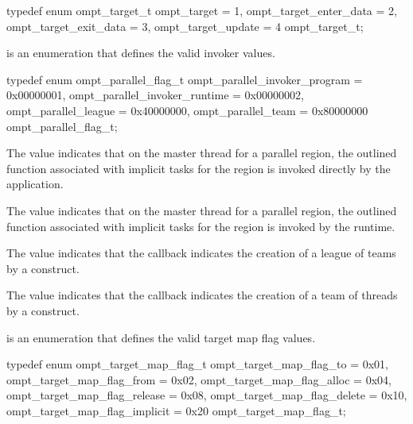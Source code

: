 \begin{ccppspecific}
\begin{omptEnum}
typedef enum ompt_target_t {
  ompt_target                         = 1,
  ompt_target_enter_data              = 2,
  ompt_target_exit_data               = 3,
  ompt_target_update                  = 4
} ompt_target_t;
\end{omptEnum}
\end{ccppspecific}





\label{sec:ompt_parallel_flag_t}
 is an enumeration that defines the valid invoker values.


\begin{ccppspecific}
\begin{omptEnum}
typedef enum ompt_parallel_flag_t {
  ompt_parallel_invoker_program = 0x00000001,
  ompt_parallel_invoker_runtime = 0x00000002,
  ompt_parallel_league          = 0x40000000,
  ompt_parallel_team            = 0x80000000
} ompt_parallel_flag_t;
\end{omptEnum}
\end{ccppspecific}

\descr

The value  indicates that on the master thread for a parallel region,
the outlined function associated with implicit tasks for the region
is invoked directly by the application.

The value  indicates that on the master thread for a parallel region, 
the outlined function associated with implicit tasks for the region
is invoked by the runtime.

The value  indicates that the callback indicates
the creation of a league of teams by a  construct.

The value  indicates that the callback indicates
the creation of a team of threads by a  construct.






\label{sec:ompt_target_map_flag_t}
 is an enumeration that defines the valid target map flag values.


\begin{ccppspecific}
\begin{omptEnum}
typedef enum ompt_target_map_flag_t {
  ompt_target_map_flag_to             = 0x01,
  ompt_target_map_flag_from           = 0x02,
  ompt_target_map_flag_alloc          = 0x04,
  ompt_target_map_flag_release        = 0x08,
  ompt_target_map_flag_delete         = 0x10,
  ompt_target_map_flag_implicit       = 0x20
} ompt_target_map_flag_t;
\end{omptEnum}
\end{ccppspecific}




